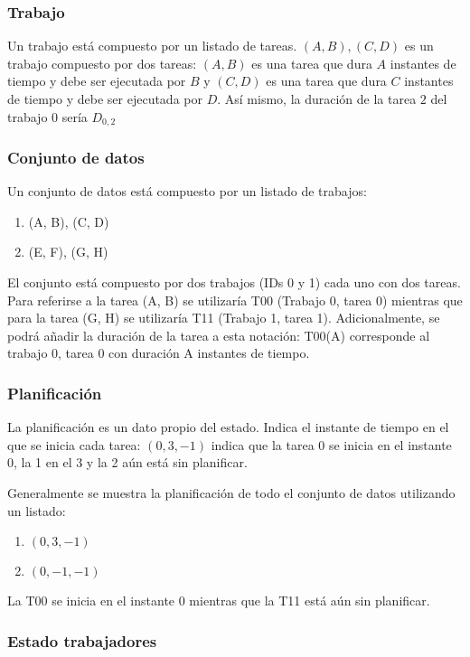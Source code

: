 \subsubsection{Trabajo}

Un trabajo está compuesto por un listado de tareas.
$(A, B), (C, D)$ es un trabajo compuesto por dos tareas:
$(A, B)$ es una tarea que dura $A$ instantes de tiempo y debe ser ejecutada por $B$ y
$(C, D)$ es una tarea que dura $C$ instantes de tiempo y debe ser ejecutada por $D$.
Así mismo, la duración de la tarea $2$ del trabajo $0$ sería $D_{0,2}$

\subsubsection{Conjunto de datos}

Un conjunto de datos está compuesto por un listado de trabajos:
\begin{enumerate}[start=0, itemsep=0.25px]
    \item (A, B), (C, D)
    \item (E, F), (G, H)
\end{enumerate}
El conjunto está compuesto por dos trabajos (IDs 0 y 1) cada uno con dos tareas.
Para referirse a la tarea (A, B) se utilizaría T00 (Trabajo 0, tarea 0)
mientras que para la tarea (G, H) se utilizaría T11 (Trabajo 1, tarea 1).
Adicionalmente, se podrá añadir la duración de la tarea a esta notación:
T00(A) corresponde al trabajo 0, tarea 0 con duración A instantes de tiempo.

\subsubsection{Planificación}

La planificación es un dato propio del estado.
Indica el instante de tiempo en el que se inicia cada tarea:
$(0, 3, -1)$ indica que la tarea 0 se inicia en el instante 0,
la 1 en el 3 y la 2 aún está sin planificar.

Generalmente se muestra la planificación de todo el conjunto de datos
utilizando un listado:
\begin{enumerate}[start=0, itemsep=0.25px]
    \item $(0, 3, -1)$
    \item $(0, -1, -1)$
\end{enumerate}
La T00 se inicia en el instante 0 mientras que la T11 está aún sin planificar.

\subsubsection{Estado trabajadores}

